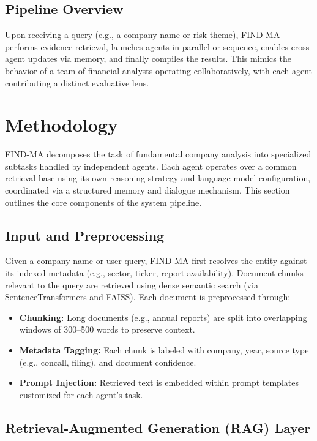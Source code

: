 \documentclass[11pt]{article}
\begin{document}
\subsection*{Pipeline Overview}

Upon receiving a query (e.g., a company name or risk theme), FIND-MA performs evidence retrieval, launches agents in parallel or sequence, enables cross-agent updates via memory, and finally compiles the results. This mimics the behavior of a team of financial analysts operating collaboratively, with each agent contributing a distinct evaluative lens.



\section{Methodology}
\label{sec:methodology}

FIND-MA decomposes the task of fundamental company analysis into specialized subtasks handled by independent agents. Each agent operates over a common retrieval base using its own reasoning strategy and language model configuration, coordinated via a structured memory and dialogue mechanism. This section outlines the core components of the system pipeline.

\subsection*{Input and Preprocessing}

Given a company name or user query, FIND-MA first resolves the entity against its indexed metadata (e.g., sector, ticker, report availability). Document chunks relevant to the query are retrieved using dense semantic search (via SentenceTransformers and FAISS). Each document is preprocessed through:

\begin{itemize}
    \item \textbf{Chunking:} Long documents (e.g., annual reports) are split into overlapping windows of 300–500 words to preserve context.
    \item \textbf{Metadata Tagging:} Each chunk is labeled with company, year, source type (e.g., concall, filing), and document confidence.
    \item \textbf{Prompt Injection:} Retrieved text is embedded within prompt templates customized for each agent’s task.
\end{itemize}

\subsection*{Retrieval-Augmented Generation (RAG) Layer}
\end{document}
